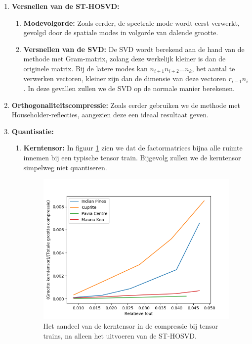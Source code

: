 \begin{enumerate}
\item \textbf{Versnellen van de ST-HOSVD:}
\begin{enumerate}
\item \textbf{Modevolgorde:} Zoals eerder, de spectrale mode wordt eerst verwerkt, gevolgd door de spatiale modes in volgorde van dalende grootte.
\item \textbf{Versnellen van de SVD:} De SVD wordt berekend aan de hand van de methode met Gram-matrix, zolang deze werkelijk kleiner is dan de originele matrix. Bij de latere modes kan $n_{i+1} n_{i+2} \dots n_k$, het aantal te verwerken vectoren, kleiner zijn dan de dimensie van deze vectoren $r_{i-1} n_i$. In deze gevallen zullen we de SVD op de normale manier berekenen.
\end{enumerate}
\item \textbf{Orthogonaliteitscompressie:} Zoals eerder gebruiken we de methode met Householder-reflecties, aangezien deze een ideaal resultaat geven.

\item \textbf{Quantisatie:}
\begin{enumerate}

\item \textbf{Kerntensor:} In figuur \ref{fig:tensor-trains-core-tensor-size} zien we dat de factormatrices bijna alle ruimte innemen bij een typische tensor train. Bijgevolg zullen we de kerntensor simpelweg niet quantiseren.

\begin{figure}[]
  \centering
  \includegraphics[scale=0.7]{images/tensor_trains_core_tensor_size.png}
  \caption{Het aandeel van de kerntensor in de compressie bij tensor trains, na alleen het uitvoeren van de ST-HOSVD.}
\label{fig:tensor-trains-core-tensor-size}
\end{figure}


\end{enumerate}
\end{enumerate}
